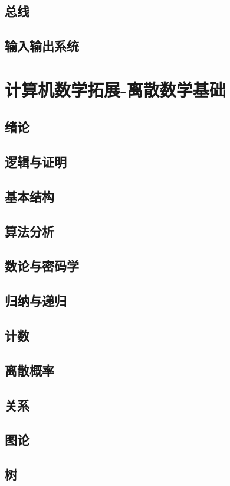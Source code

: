 \documentclass[UTF8]{ctexbook}
\begin{document}
        \section{总线}
        \section{输入输出系统}
    \newpage
    \chapter{计算机数学拓展-离散数学基础}
        \section{绪论}
        \section{逻辑与证明}
        \section{基本结构}
        \section{算法分析}
        \section{数论与密码学}
        \section{归纳与递归}
        \section{计数}
        \section{离散概率}
        \section{关系}
        \section{图论}
        \section{树}
\end{document}
